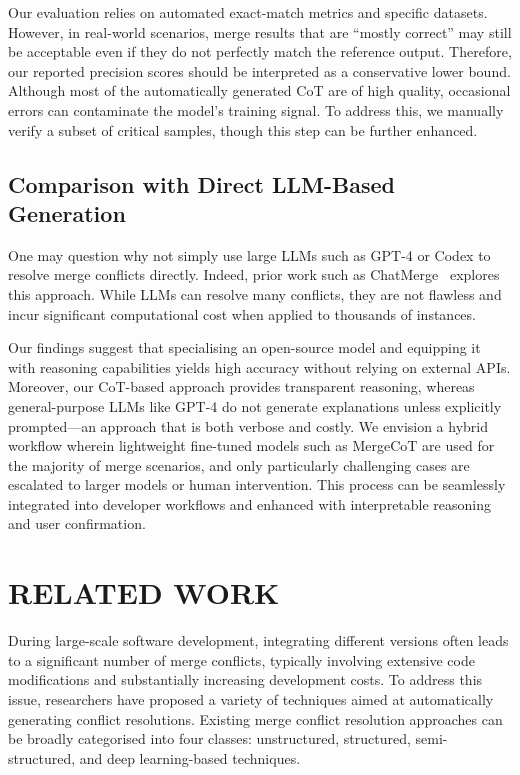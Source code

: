 \documentclass[sigconf,review,anonymous]{acmart}
\begin{document}
Our evaluation relies on automated exact-match metrics and specific datasets. However, in real-world scenarios, merge results that are “mostly correct” may still be acceptable even if they do not perfectly match the reference output. Therefore, our reported precision scores should be interpreted as a conservative lower bound.
Although most of the automatically generated CoT are of high quality, occasional errors can contaminate the model's training signal. To address this, we manually verify a subset of critical samples, though this step can be further enhanced.

\subsection{Comparison with Direct LLM-Based Generation}

One may question why not simply use large LLMs such as GPT-4 or Codex to resolve merge conflicts directly. Indeed, prior work such as ChatMerge~\cite{17} explores this approach. While LLMs can resolve many conflicts, they are not flawless and incur significant computational cost when applied to thousands of instances.

Our findings suggest that specialising an open-source model and equipping it with reasoning capabilities yields high accuracy without relying on external APIs. Moreover, our CoT-based approach provides transparent reasoning, whereas general-purpose LLMs like GPT-4 do not generate explanations unless explicitly prompted—an approach that is both verbose and costly.
We envision a hybrid workflow wherein lightweight fine-tuned models such as MergeCoT are used for the majority of merge scenarios, and only particularly challenging cases are escalated to larger models or human intervention. This process can be seamlessly integrated into developer workflows and enhanced with interpretable reasoning and user confirmation.

\section{RELATED WORK}
During large-scale software development, integrating different versions often leads to a significant number of merge conflicts, typically involving extensive code modifications and substantially increasing development costs. To address this issue, researchers have proposed a variety of techniques aimed at automatically generating conflict resolutions. Existing merge conflict resolution approaches can be broadly categorised into four classes: unstructured, structured, semi-structured, and deep learning-based techniques.
\end{document}
